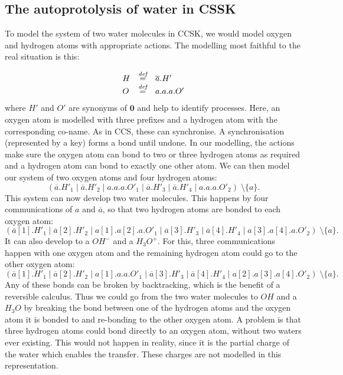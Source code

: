 \documentclass[runningheads]{llncs}
\newcommand{\paral}{\; \vert \;}
\newcommand{\Nil}{\mathbf{0}}
\newcommand{\bydef}{\stackrel{\emph{def}}{=}}
\begin{document}
\subsection{The autoprotolysis of water in CSSK}

To model the system of two water molecules in CCSK, we would model oxygen and hydrogen atoms with appropriate actions. The modelling most faithful to the real situation is this:

%
$$\begin{array}{lll}
H & \bydef & \overline{a}.H'\\
O & \bydef & a.a.a.O'
\end{array}$$
%
where $H'$ and $O'$ are synonyms of $\Nil$ and help to identify processes. Here, an oxygen atom is modelled with three prefixes and a hydrogen atom with the corresponding co-name. As in CCS, these can synchronise. A synchronisation (represented by a key) forms a bond until undone. In our modelling, the actions make sure the oxygen atom can bond to two or three hydrogen atoms as required and a hydrogen atom can bond to exactly one other atom. We can then model our system of two oxygen atoms and four hydrogen atoms:
%
$$( \overline{a}.H'_1 \paral \overline{a}.H'_2 \paral a.a.a.O'_1 \paral \overline{a}.H'_3 \paral \overline{a}.H'_4 \paral a.a.a.O'_2) 
\; \setminus\{a\}.$$
%
This system can now develop two water molecules. This happens by four communications of $a$ and $\overline{a}$, so that two hydrogen atoms are bonded to each oxygen atom:
%
$$( \overline{a}[1].H'_1 \paral \overline{a}[2].H'_2 \paral a[1].a[2].a.O'_1 \paral \overline{a}[3].H'_3 \paral \overline{a}[4].H'_4 \paral a[3].a[4].a.O'_2) 
\; \setminus\{a\}.$$
%
It can also develop to a $OH^-$ and a $H_3O^+$. For this, three communications happen with one oxygen atom and the remaining hydrogen atom could go to the other oxygen atom:
%
$$( \overline{a}[1].H'_1 \paral \overline{a}[2].H'_2 \paral a[1].a.a.O'_1 \paral \overline{a}[3].H'_3 \paral \overline{a}[4].H'_4 \paral a[2].a[3].a[4].O'_2) 
\; \setminus\{a\}.$$
%
Any of these bonds can be broken by backtracking, which is the benefit of a reversible calculus. Thus we could go from the two water molecules to $OH$ and a $H_3O$ by breaking the bond between one of the hydrogen atoms and the oxygen atom it is bonded to and re-bonding to the other oxygen atom. A problem is that three hydrogen atoms could bond directly to an oxygen atom, without two waters ever existing. This would not happen in reality, since it is the partial charge of the water which enables the transfer. These charges are not modelled in this representation.
\end{document}
